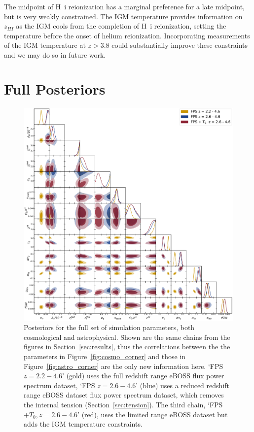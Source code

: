 The midpoint of H~{\sc i} reionization has a marginal preference for a late midpoint, but is very weakly constrained.
The IGM temperature provides information on $z_{HI}$ as the IGM cools from the completion of H~{\sc i} reionization, setting the temperature before the onset of helium reionization.
Incorporating measurements of the IGM temperature at $z > 3.8$  \cite[e.g.~][]{2023arXiv230402038G} could substantially improve these constraints and we may do so in future work.

\section{Full Posteriors}
\label{sec:full_posteriors}
\begin{figure}
    \centering
    \includegraphics[width=\textwidth]{figures/allp_corner.pdf}
    \caption{\label{fig:full_posterior}
    Posteriors for the full set of simulation parameters, both cosmological and astrophysical.
    Shown are the same chains from the figures in Section~\ref{sec:results}, thus the correlations between the the parameters in Figure~\ref{fig:cosmo_corner} and those in Figure~\ref{fig:astro_corner} are the only new information here. `FPS $z=2.2-4.6$' (gold) uses the full redshift range eBOSS flux power spectrum dataset, `FPS $z=2.6-4.6$' (blue) uses a reduced redshift range eBOSS dataset flux power spectrum dataset, which removes the internal tension (Section~\ref{sec:tension}).
    The third chain, `FPS $+T_0, z=2.6-4.6$' (red), uses the limited range eBOSS dataset but adds the IGM temperature constraints.
    }
\end{figure}

